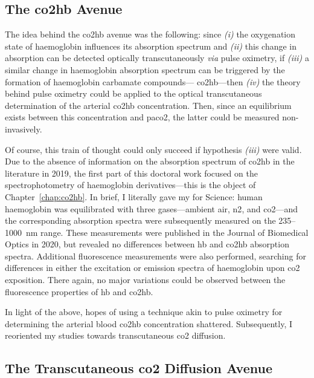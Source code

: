 \subsection{The \texorpdfstring{\gls{co2hb}}{Carbamino-Haemoglobin (CO2Hb)} Avenue}

The idea behind the \gls{co2hb} avenue was the following: since \textit{(i)} the oxygenation state of haemoglobin influences its absorption spectrum\cite{prahl1998} and \textit{(ii)} this change in absorption can be detected optically transcutaneously \textit{via} pulse oximetry\cite{nitzan2014, jubran2015}, if \textit{(iii)} a similar change in haemoglobin absorption spectrum can be triggered by the formation of haemoglobin carbamate compounds---\ie{} \gls{co2hb}---then \textit{(iv)} the theory behind pulse oximetry could be applied to the optical transcutaneous determination of the arterial \gls{co2hb} concentration. Then, since an equilibrium exists between this concentration and \gls{paco2}\cite{geers2000}, the latter could be measured non-invasively.

Of course, this train of thought could only succeed if hypothesis \textit{(iii)} were valid. Due to the absence of information on the absorption spectrum of \gls{co2hb} in the literature in 2019, the first part of this doctoral work focused on the spectrophotometry of haemoglobin derivatives---this is the object of Chapter~\ref{chap:co2hb}. In brief, I literally gave my \myblood{} for Science: human haemoglobin was equilibrated with three gases---ambient air, \gls{n2}, and \gls{co2}---and the corresponding absorption spectra were subsequently measured on the 235--1000~nm range. These measurements were published in the Journal of Biomedical Optics in 2020\cite{dervieux2020}, but revealed no differences between \gls{hb} and \gls{co2hb} absorption spectra. Additional fluorescence measurements were also performed, searching for differences in either the excitation or emission spectra of haemoglobin upon \gls{co2} exposition. There again, no major variations could be observed between the fluorescence properties of \gls{hb} and \gls{co2hb}. 

In light of the above, hopes of using a technique akin to pulse oximetry for determining the arterial blood \gls{co2hb} concentration shattered. Subsequently, I reoriented my studies towards transcutaneous \gls{co2} diffusion.

\subsection{The Transcutaneous \texorpdfstring{\gls{co2}}{CO2} Diffusion Avenue}

